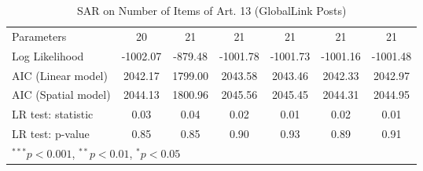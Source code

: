 \begin{table}[!h]
\begin{center}
\begin{tabular}{l c c c c c c }
Parameters              & 20           & 21           & 21           & 21           & 21           & 21           \\
Log Likelihood          & -1002.07     & -879.48      & -1001.78     & -1001.73     & -1001.16     & -1001.48     \\
AIC (Linear model)      & 2042.17      & 1799.00      & 2043.58      & 2043.46      & 2042.33      & 2042.97      \\
AIC (Spatial model)     & 2044.13      & 1800.96      & 2045.56      & 2045.45      & 2044.31      & 2044.95      \\
LR test: statistic      & 0.03         & 0.04         & 0.02         & 0.01         & 0.02         & 0.01         \\
LR test: p-value        & 0.85         & 0.85         & 0.90         & 0.93         & 0.89         & 0.91         \\
\bottomrule
\multicolumn{7}{l}{\scriptsize{$^{***}p<0.001$, $^{**}p<0.01$, $^*p<0.05$}}
\end{tabular}
\caption{SAR on Number of Items of Art. 13 (GlobalLink Posts)}
\label{table:coefficients}
\end{center}
\end{table}
